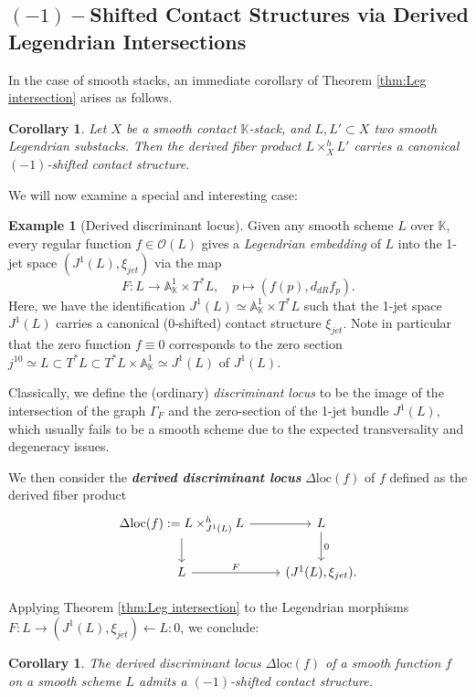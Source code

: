 \documentclass[reqno]{amsart}
\newtheorem{corollary}[theorem]{Corollary}
\theoremstyle{definition}
\newtheorem{example}[theorem]{Example}
\theoremstyle{remark}
\newcommand{\cO}{\mathcal{O}}
\newcommand{\K}{\mathbb{K}}
\newcommand{\bfem}[1]{\textbf{\textit{#1}}}
\begin{document}
{\subsection{\texorpdfstring{$(-1)-$}-Shifted Contact Structures via  Derived Legendrian Intersections}

In the case of smooth stacks, an immediate corollary of Theorem \ref{thm:Leg intersection} arises as follows.
\begin{corollary}
    Let $X$ be a smooth contact $\K$-stack, 
and 
$L, L' \subset X$ two smooth Legendrian substacks.
Then the derived fiber product 
\(
L \times_X^h L'
\)
carries a canonical $(-1)$-shifted contact structure.
\end{corollary}

We will now examine a special and interesting case:
\begin{example}[Derived discriminant locus]\label{example: ddislocus}
Given any smooth scheme $L$ over $\K$, every regular function $f\in \cO(L)$ gives a\textit{ Legendrian embedding} of $L$ into the 1-jet space $(J^1(L), \xi_{jet})$ via the map \cite{Geiges} $$F:L\longrightarrow \mathbb{A}^1_\K \times T^*L, \quad p \mapsto (f(p),d_{dR}f_p).$$ Here,  we have the identification $J^1(L)\simeq \mathbb{A}^1_\K \times T^*L$ such that the 1-jet space $J^1(L)$ carries a canonical (0-shifted) contact structure $\xi_{jet}$. Note in particular that the zero function $f\equiv0$ corresponds to the zero section $j^10 \simeq L \subset T^*L \subset T^*L \times \mathbb{A}^1_\K \simeq J^1(L)$ of  $J^1(L).$

Classically, we define the (ordinary) \textit{discriminant locus} 
to be the image of the intersection of the graph $\Gamma_F$ and the zero-section of the 1-jet bundle $J^1(L),$ which usually fails to be a smooth scheme due to the expected transversality and degeneracy issues.

We then consider the \bfem{derived discriminant locus} $\Delta\mathrm{loc}(f)$ of $f$ defined as the derived fiber product
 \[\begin{tikzcd}
 \Delta\mathrm{loc}(f):= L \times_{J^1(L)}^h L   \arrow[r]   \arrow[d]             & L \arrow[d,"{0}"] \\
L \arrow[r, "F"] & (J^1(L), \xi_{jet}).                    
\end{tikzcd}\] 


Applying Theorem \ref{thm:Leg intersection} to the Legendrian morphisms $F: L\rightarrow (J^1(L), \xi_{jet}) \leftarrow L :{0}$, we conclude:
\begin{corollary}
The derived discriminant locus
$\Delta\mathrm{loc}(f)$ of a smooth function $f$ on a smooth scheme $L$ admits a $(-1)$-shifted contact structure.
   

\end{corollary}
\end{example}}
\end{document}
